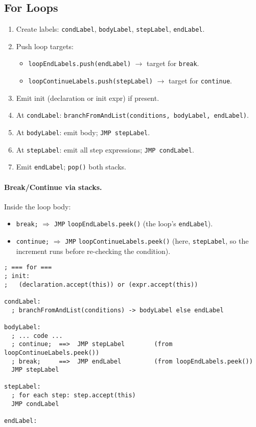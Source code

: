 \documentclass[12pt,a4paper]{report}
\begin{document}
\subsection{For Loops}
\begin{enumerate}
  \item Create labels: \texttt{condLabel}, \texttt{bodyLabel}, \texttt{stepLabel}, \texttt{endLabel}.
  \item Push loop targets:
    \begin{itemize}
      \item \texttt{loopEndLabels.push(endLabel)} \(\rightarrow\) target for \texttt{break}.
      \item \texttt{loopContinueLabels.push(stepLabel)} \(\rightarrow\) target for \texttt{continue}.
    \end{itemize}
  \item Emit init (declaration or init expr) if present.
  \item At \texttt{condLabel}: \texttt{branchFromAndList(conditions, bodyLabel, endLabel)}.
  \item At \texttt{bodyLabel}: emit body; \texttt{JMP stepLabel}.
  \item At \texttt{stepLabel}: emit all step expressions; \texttt{JMP condLabel}.
  \item Emit \texttt{endLabel}; \texttt{pop()} both stacks.
\end{enumerate}

\paragraph{Break/Continue via stacks.}
Inside the loop body:
\begin{itemize}
  \item \texttt{break;} \(\Rightarrow\) \texttt{JMP} \texttt{loopEndLabels.peek()} (the loop’s \texttt{endLabel}).
  \item \texttt{continue;} \(\Rightarrow\) \texttt{JMP} \texttt{loopContinueLabels.peek()} (here, \texttt{stepLabel}, so the increment runs before re-checking the condition).
\end{itemize}

\begin{lstlisting}[language=SAYACasm, style=code]
; === for ===
; init:
;   (declaration.accept(this)) or (expr.accept(this))

condLabel:
  ; branchFromAndList(conditions) -> bodyLabel else endLabel

bodyLabel:
  ; ... code ...
  ; continue;  ==>  JMP stepLabel        (from loopContinueLabels.peek())
  ; break;     ==>  JMP endLabel         (from loopEndLabels.peek())
  JMP stepLabel

stepLabel:
  ; for each step: step.accept(this)
  JMP condLabel

endLabel:
\end{lstlisting}
\end{document}
